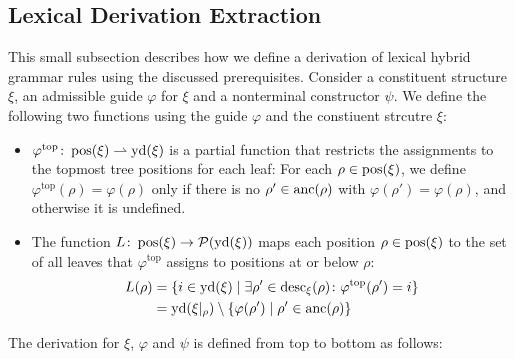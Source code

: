 \documentclass[../../document.tex]{subfiles}
\begin{document}
    \subsection{Lexical Derivation Extraction}\label{sec:extractionalg}
    This small subsection describes how we define a derivation of lexical hybrid grammar rules using the discussed prerequisites.
    Consider a constituent structure \(\xi\), an admissible guide \(\varphi\) for \(\xi\) and a nonterminal constructor \(\psi\).
    We define the following two functions using the guide \(\varphi\) and the constiuent strcutre \(\xi\):
    \begin{itemize}
        \item
            \(\varphi^{\text{top}}\colon \operatorname{pos}(\xi) \rightharpoonup \operatorname{yd}(\xi)\) is a partial function that restricts the assignments to the topmost tree positions for each leaf:
            For each \(\rho \in \operatorname{pos}(\xi)\), we define \(\varphi^{\text{top}}(\rho) = \varphi(\rho)\) only if there is no \(\rho' \in \operatorname{anc}(\rho)\) with \(\varphi(\rho') = \varphi(\rho)\), and otherwise it is undefined.
        \item
            The function \(L\colon \operatorname{pos}(\xi) \to \mathcal{P}(\operatorname{yd}(\xi))\) maps each position \(\rho\in \operatorname{pos}(\xi)\) to the set of all leaves that \(\varphi^{\text{top}}\) assigns to positions at or below \(\rho\):
                \begin{align*}
                    L(\rho) &= \{ i \in \operatorname{yd}(\xi) \mid \exists \rho' \in \operatorname{desc}_\xi(\rho)\colon \varphi^{\text{top}}(\rho') = i \} \\
                            &= \operatorname{yd}(\xi|_\rho) \setminus \{ \varphi(\rho') \mid \rho' \in \operatorname{anc}(\rho) \}
                \end{align*}
    \end{itemize}
    The derivation for \(\xi\), \(\varphi\) and \(\psi\) is defined from top to bottom as follows:
\end{document}
